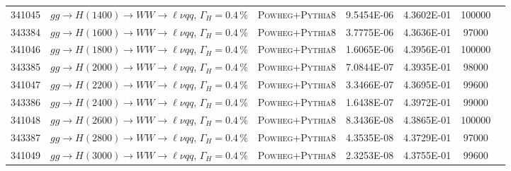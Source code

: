 \begin{landscape}
\begin{table}[!htb]
\begin{footnotesize}
\begin{center}
\begin{tabular}{c|l|c|c|c|cr}
	341045 & $gg \to H(1400) \to WW \to \ell\nu qq$, $\Gamma_H=0.4\,\%$ & \textsc{Powheg}+\textsc{Pythia8} & 9.5454E-06 & 4.3602E-01 & 100000 \\
	343384 & $gg \to H(1600) \to WW \to \ell\nu qq$, $\Gamma_H=0.4\,\%$ & \textsc{Powheg}+\textsc{Pythia8} & 3.7775E-06 & 4.3636E-01 & 97000 \\
	341046 & $gg \to H(1800) \to WW \to \ell\nu qq$, $\Gamma_H=0.4\,\%$ & \textsc{Powheg}+\textsc{Pythia8} & 1.6065E-06 & 4.3956E-01 & 100000 \\
	343385 & $gg \to H(2000) \to WW \to \ell\nu qq$, $\Gamma_H=0.4\,\%$ & \textsc{Powheg}+\textsc{Pythia8} & 7.0844E-07 & 4.3935E-01 & 98000 \\
	341047 & $gg \to H(2200) \to WW \to \ell\nu qq$, $\Gamma_H=0.4\,\%$ & \textsc{Powheg}+\textsc{Pythia8} & 3.3466E-07 & 4.3695E-01 & 99600 \\
	343386 & $gg \to H(2400) \to WW \to \ell\nu qq$, $\Gamma_H=0.4\,\%$ & \textsc{Powheg}+\textsc{Pythia8} & 1.6438E-07 & 4.3972E-01 & 99000 \\
	341048 & $gg \to H(2600) \to WW \to \ell\nu qq$, $\Gamma_H=0.4\,\%$ & \textsc{Powheg}+\textsc{Pythia8} & 8.3436E-08 & 4.3865E-01 & 100000 \\
	343387 & $gg \to H(2800) \to WW \to \ell\nu qq$, $\Gamma_H=0.4\,\%$ & \textsc{Powheg}+\textsc{Pythia8} & 4.3535E-08 & 4.3729E-01 & 97000 \\
	341049 & $gg \to H(3000) \to WW \to \ell\nu qq$, $\Gamma_H=0.4\,\%$ & \textsc{Powheg}+\textsc{Pythia8} & 2.3253E-08 & 4.3755E-01 & 99600 \\
\hline\hline
\end{tabular}
\end{center}
\end{footnotesize}
\end{table}


\end{landscape}
